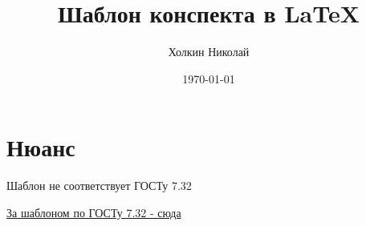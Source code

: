 


	\title{Шаблон конспекта в LaTeX}
	\author{Холкин Николай}
	\date{\today}
	
	\maketitle
	\tableofcontents
	\newpage
	
	\section{Нюанс}
		Шаблон не соответствует ГОСТу 7.32
		
		\href{https://github.com/latex-g7-32/latex-g7-32/releases/tag/5.0.0}{За шаблоном по ГОСТу 7.32 - сюда}
